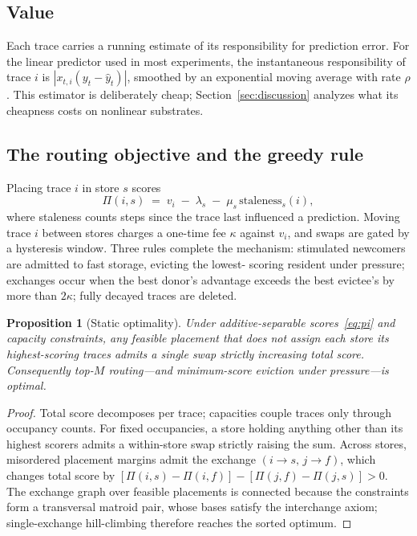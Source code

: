 \documentclass[11pt]{article}
\newtheorem{proposition}{Proposition}
\begin{document}
\subsection{Value}
Each trace carries a running estimate of its responsibility for prediction error. For the linear
predictor used in most experiments, the instantaneous responsibility of trace $i$ is
$|x_{t,i}(y_t-\hat y_t)|$, smoothed by an exponential moving average with rate $\rho$. This estimator is
deliberately cheap; Section~\ref{sec:discussion} analyzes what its cheapness costs on nonlinear
substrates.

\subsection{The routing objective and the greedy rule}
Placing trace $i$ in store $s$ scores
\begin{equation}
\Pi(i,s) \;=\; v_i \;-\; \lambda_s \;-\; \mu_s\,\mathrm{staleness}_s(i),
\label{eq:pi}
\end{equation}
where staleness counts steps since the trace last influenced a prediction. Moving trace $i$ between
stores charges a one-time fee $\kappa$ against $v_i$, and swaps are gated by a hysteresis window. Three
rules complete the mechanism: stimulated newcomers are admitted to fast storage, evicting the lowest-
scoring resident under pressure; exchanges occur when the best donor's advantage exceeds the best
evictee's by more than $2\kappa$; fully decayed traces are deleted.

\begin{proposition}[Static optimality]
\label{prop:static}
Under additive-separable scores~\eqref{eq:pi} and capacity constraints, any feasible placement that
does not assign each store its highest-scoring traces admits a single swap strictly increasing total
score. Consequently top-$M$ routing---and minimum-score eviction under pressure---is optimal.
\end{proposition}
\begin{proof}
Total score decomposes per trace; capacities couple traces only through occupancy counts. For fixed
occupancies, a store holding anything other than its highest scorers admits a within-store swap strictly
raising the sum. Across stores, misordered placement margins admit the exchange
$(i\!\to\! s,\, j\!\to\! f)$, which changes total score by
$[\Pi(i,s)-\Pi(i,f)]-[\Pi(j,f)-\Pi(j,s)]>0$. The exchange graph over feasible placements is connected
because the constraints form a transversal matroid pair, whose bases satisfy the interchange axiom;
single-exchange hill-climbing therefore reaches the sorted optimum.
\end{proof}
\end{document}
